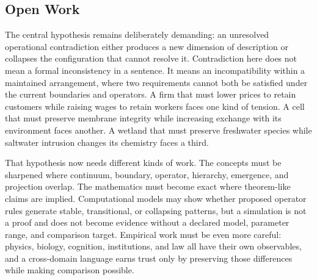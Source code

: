 \documentclass[11pt,a4paper,openany]{book}
\begin{document}
\subsection{Open Work}
The central hypothesis remains deliberately demanding: an unresolved operational contradiction either produces a new dimension of description or collapses the configuration that cannot resolve it. Contradiction here does not mean a formal inconsistency in a sentence. It means an incompatibility within a maintained arrangement, where two requirements cannot both be satisfied under the current boundaries and operators. A firm that must lower prices to retain customers while raising wages to retain workers faces one kind of tension. A cell that must preserve membrane integrity while increasing exchange with its environment faces another. A wetland that must preserve freshwater species while saltwater intrusion changes its chemistry faces a third. \cite{haken_synergetics,nicolis_prigogine_selforg}\par
That hypothesis now needs different kinds of work. The concepts must be sharpened where continuum, boundary, operator, hierarchy, emergence, and projection overlap. The mathematics must become exact where theorem-like claims are implied. Computational models may show whether proposed operator rules generate stable, transitional, or collapsing patterns, but a simulation is not a proof and does not become evidence without a declared model, parameter range, and comparison target. Empirical work must be even more careful: physics, biology, cognition, institutions, and law all have their own observables, and a cross-domain language earns trust only by preserving those differences while making comparison possible.\par
\end{document}
